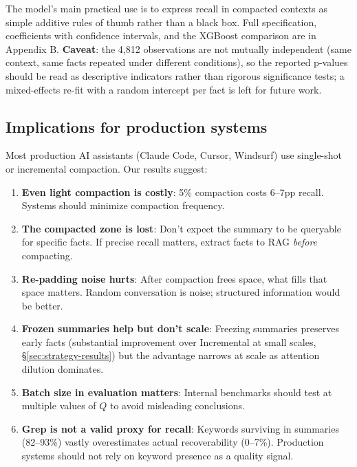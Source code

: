 The model's main practical use is to express recall in compacted contexts
as simple additive rules of thumb rather than a black box. Full
specification, coefficients with confidence intervals, and the XGBoost
comparison are in Appendix B. \textbf{Caveat}: the 4{,}812 observations are not
mutually independent (same context, same facts repeated under different
conditions), so the reported p-values should be read as descriptive
indicators rather than rigorous significance tests; a mixed-effects
re-fit with a random intercept per fact is left for future work.

\subsection{Implications for production systems}
\label{sec:production}

Most production AI assistants (Claude Code, Cursor, Windsurf) use single-shot
or incremental compaction. Our results suggest:

\begin{enumerate}
  \item \textbf{Even light compaction is costly}: 5\% compaction costs 6--7pp recall.
    Systems should minimize compaction frequency.
  \item \textbf{The compacted zone is lost}: Don't expect the summary to be queryable
    for specific facts. If precise recall matters, extract facts to RAG
    \textit{before} compacting.
  \item \textbf{Re-padding noise hurts}: After compaction frees space, what fills that
    space matters. Random conversation is noise; structured information would
    be better.
  \item \textbf{Frozen summaries help but don't scale}: Freezing summaries preserves
    early facts (substantial improvement over Incremental at small scales, \S\ref{sec:strategy-results}) but the
    advantage narrows at scale as attention dilution dominates.
  \item \textbf{Batch size in evaluation matters}: Internal benchmarks should test at
    multiple values of $Q$ to avoid misleading conclusions.
  \item \textbf{Grep is not a valid proxy for recall}: Keywords surviving in summaries
    (82--93\%) vastly overestimates actual recoverability (0--7\%). Production
    systems should not rely on keyword presence as a quality signal.
\end{enumerate}
